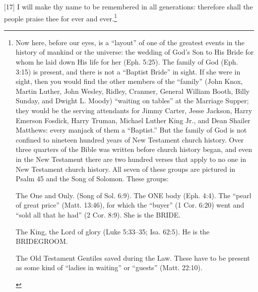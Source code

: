 [17] \textcolor[rgb]{0.00,0.00,1.00}{I will make thy name to be remembered in all generations: therefore shall the people praise thee for ever and ever.}\footnote{Now here, before our eyes, is a “layout” of one of the greatest events in the history of mankind or the universe: the wedding of God’s Son to His Bride for whom he laid down His life for her (Eph. 5:25). The family of God (Eph. 3:15) is present, and there is not a “Baptist Bride” in sight. If she were in sight, then you would find the other members of the “family” (John Knox, Martin Luther, John Wesley, Ridley, Cranmer, General William Booth, Billy Sunday, and Dwight L. Moody) “waiting on tables” at the Marriage Supper; they would be the serving attendants for Jimmy Carter, Jesse Jackson, Harry Emerson Fosdick, Harry Truman, Michael Luther King Jr., and Dean Shailer Matthews: every manjack of them a “Baptist.” But the family of God is not confined to nineteen hundred years of New Testament church history. Over three quarters of the Bible was written before church history began, and even in the New Testament there are two hundred verses that apply to no one in New Testament church history. All seven of these groups are pictured in Psalm 45 and the Song of Solomon. These groups:
\begin{compactenum}
\item The One and Only. (Song of Sol. 6:9). The ONE body (Eph. 4:4). The “pearl of great price” (Matt. 13:46), for which the “buyer” (1 Cor. 6:20) went and “sold all that he had” (2 Cor. 8:9). She is the BRIDE.
\item The King, the Lord of glory (Luke 5:33–35; Isa. 62:5). He is the BRIDEGROOM.
\item The Old Testament Gentiles saved during the Law. These have to be present as some kind of “ladies in waiting” or “guests” (Matt. 22:10).

\end{compactenum}}
